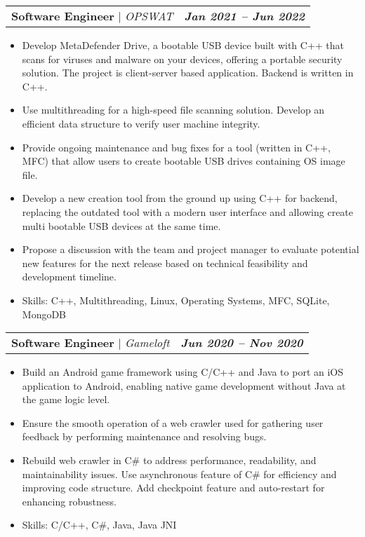 \documentclass[letterpaper,1pt]{article}
\makeatletter
\newcommand{\resumeItem}[1]{
  \item\large{
    {#1 \vspace{-4pt}}
  }
}
\newcommand{\titleItem}[1]{
  \large\textbf{#1}
}
\newcommand{\resumeProjectHeading}[2]{
    \item
    \begin{tabular*}{0.97\textwidth}{l@{\extracolsep{\fill}}r}
      #1 & \textit{\large #2} \\
    \end{tabular*}\vspace{-9pt}
}
\newcommand{\resumeItemListStart}{
\begin{itemize}}
\newcommand{\resumeItemListEnd}{
\end{itemize}\vspace{-8pt}}
\makeatother
\begin{document}
      \resumeProjectHeading
           {\titleItem{{Software Engineer}} $|$ \emph{OPSWAT}}{\textbf{Jan 2021 -- Jun 2022}}
      \resumeItemListStart
        \resumeItem{Develop MetaDefender Drive, a bootable USB device built with C++ that scans for viruses and malware on your devices, offering a portable security solution. The project is client-server based application. Backend is written in C++.}
        \resumeItem{Use multithreading  for a high-speed file scanning solution. Develop an efficient data structure to verify user machine integrity.}
        \resumeItem{Provide ongoing maintenance and bug fixes for a tool (written in C++, MFC) that allow users to create bootable USB drives containing OS image file.}
        \resumeItem{Develop a new creation tool from the ground up using C++ for backend, replacing the outdated tool with a modern user interface and allowing create multi bootable USB devices at the same time.}
        \resumeItem{Propose a discussion with the team and project manager to evaluate potential new features for the next release based on technical feasibility and development timeline.}
        \resumeItem{Skills: C++, Multithreading, Linux, Operating Systems, MFC, SQLite, MongoDB}
      \resumeItemListEnd


    \resumeProjectHeading
           {\titleItem{{Software Engineer}} $|$ \emph{Gameloft}}{\textbf{Jun 2020 -- Nov 2020}}
      \resumeItemListStart
        \resumeItem{Build an Android game framework using C/C++ and Java to port an iOS application to Android, enabling native game development without Java at the game logic level.}
        \resumeItem{Ensure the smooth operation of a web crawler used for gathering user feedback by performing maintenance and resolving bugs.}
        \resumeItem{Rebuild web crawler in C\# to address performance, readability, and maintainability issues. Use asynchronous feature of C\# for efficiency and improving code structure. Add checkpoint feature and auto-restart for enhancing robustness.}
        \resumeItem{Skills: C/C++, C\#, Java, Java JNI}
        \resumeItemListEnd
        
\end{document}
